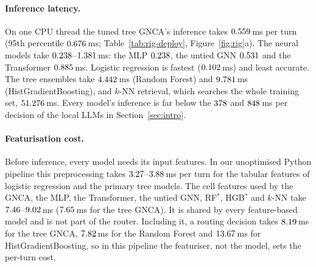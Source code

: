 \documentclass[10pt]{article}
\begin{document}
\paragraph{Inference latency.} On one CPU thread the tuned tree GNCA's inference takes $0.559$\,ms per turn (95th percentile $0.676$\,ms; Table~\ref{tab:rig-deploy}, Figure~\ref{fig:rig}a). The neural models take $0.238$--$1.381$\,ms: the MLP $0.238$, the untied GNN $0.531$ and the Transformer $0.885$\,ms. Logistic regression is fastest ($0.102$\,ms) and least accurate. The tree ensembles take $4.442$\,ms (Random Forest) and $9.781$\,ms (HistGradientBoosting), and $k$-NN retrieval, which searches the whole training set, $51.276$\,ms. Every model's inference is far below the $378$ and $848$\,ms per decision of the local LLMs in Section~\ref{sec:intro}.

\paragraph{Featurisation cost.} Before inference, every model needs its input features. In our unoptimised Python pipeline this preprocessing takes $3.27$--$3.88$\,ms per turn for the tabular features of logistic regression and the primary tree models. The cell features used by the GNCA, the MLP, the Transformer, the untied GNN, RF$^\ast$, HGB$^\ast$ and $k$-NN take $7.46$--$9.02$\,ms ($7.65$\,ms for the tree GNCA). It is shared by every feature-based model and is not part of the router. Including it, a routing decision takes $8.19$\,ms for the tree GNCA, $7.82$\,ms for the Random Forest and $13.67$\,ms for HistGradientBoosting, so in this pipeline the featuriser, not the model, sets the per-turn cost.

\begin{table}[t]
\centering
\scriptsize
\caption{Head-to-head CPU efficiency across all four benchmarks and all thirteen models (five seeds, median over seeds). All models were refitted on CPU at their selected configurations; Train$_8$ is wall-clock training time on 8 physical cores (1-thread training in the released summary file), Infer is 1-thread batch-1 model forward/predict time (1{,}000 turns after 50 warm-up turns; featurisation excluded).}
\label{tab:efficiency-1118}

\end{table}
\end{document}
